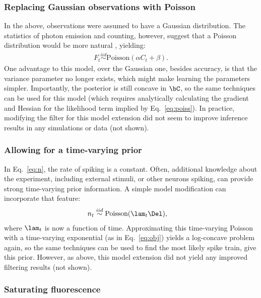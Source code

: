 \subsubsection{Replacing Gaussian observations with Poisson}

In the above, observations were assumed to have a Gaussian distribution.  The statistics of photon emission and counting, however, suggest that a Poisson distribution would be more natural \cite{SjulsonMiesenbock07}, yielding:
\begin{align} \label{eq:poiss}
	F_t \overset{iid}{\sim}\text{Poisson}(\alpha C_t + \beta).
\end{align}
One advantage to this model, over the Gaussian one, besides accuracy, is that the variance parameter no longer exists, which might make learning the parameters simpler.  Importantly, the posterior is still concave in $\bC$, so the same techniques can be used for this model (which requires analytically calculating the gradient and Hessian for the likelihood term implied by Eq.~\eqref{eq:poiss}).  In practice, modifying the filter for this model extension did not seem to improve inference results in any simulations or data (not shown).

\subsubsection{Allowing for a time-varying prior}

In Eq.~\eqref{eq:n}, the rate of spiking is a constant.  Often, additional knowledge about the experiment, including external stimuli, or other neurons spiking, can provide strong time-varying prior information.  A simple model modification can incorporate that feature:
\begin{align}
	n_t &\overset{iid}{\sim} \text{Poisson}(\lam_t \Del),
\end{align}
where $\lam_t$ is now a function of time.  Approximating this time-varying Poisson with a time-varying exponential (as in Eq.~\eqref{eq:obj}) yields a log-concave problem again, so the same techniques can be used to find the most likely spike train, give this prior.  However, as above, this model extension did not yield any improved filtering results (not shown).

\subsubsection{Saturating fluorescence}

